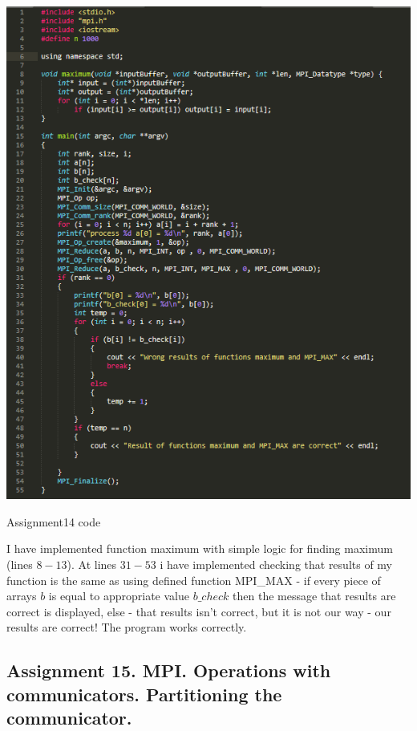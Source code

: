 \documentclass[%
12pt, %
final, %
oneside, %
onecolumn, %
centertags]{article} %
\theoremstyle{plain}
\theoremstyle{definition}
\theoremstyle{remark}
\begin{document}
\begin{center}
\includegraphics[scale=1]{14.1.code.png}

Assignment14 code
\end{center}

I have implemented function maximum with simple logic for finding maximum (lines $8-13$). At lines $31-53$ i have implemented checking that results of my function is the same as using defined function \textsc{MPI\_MAX} - if every piece of arrays $b$ is equal to appropriate value $b\_check$ then the message that results are correct is displayed, else - that results isn't correct, but it is not our way - our results are correct! The program works correctly.





\newpage
\subsection{Assignment 15. MPI. Operations with communicators. Partitioning the communicator.}
\end{document}
